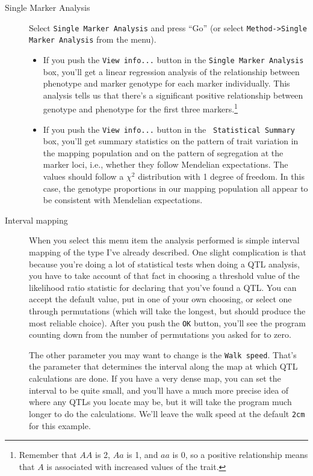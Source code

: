 \documentclass[12pt]{article}
\begin{document}
\begin{description}

\item[Single Marker Analysis] Select {\tt Single Marker Analysis} and
  press ``Go''  (or select {\tt Method->Single Marker Analysis} from the menu).

\begin{itemize}

\item If you push the {\tt View info...} button in the {\tt Single
    Marker Analysis} box, you'll get a linear regression analysis of
  the relationship between phenotype and marker genotype for each
  marker individually. This analysis tells us that there's a
  significant positive relationship between genotype and phenotype for
  the first three markers.\footnote{Remember that $AA$ is 2, $Aa$ is
    1, and $aa$ is 0, so a positive relationship means that $A$ is
    associated with increased values of the trait.}

\item If you push the {\tt View info...} button in the {\tt
  Statistical Summary} box, you'll get summary statistics on the
  pattern of trait variation in the mapping population and on the
  pattern of segregation at the marker loci, i.e., whether they follow
  Mendelian expectations. The values should follow a $\chi^2$
  distribution with 1 degree of freedom. In this case, the genotype
  proportions in our mapping population all appear to be consistent
  with Mendelian expectations.

\end{itemize}

\item[Interval mapping] When you select this menu item the analysis
  performed is simple interval mapping of the type I've already
  described. One slight complication is that because you're doing a
  lot of statistical tests when doing a QTL analysis, you have to take
  account of that fact in choosing a threshold value of the likelihood
  ratio statistic for declaring that you've found a QTL. You can
  accept the default value, put in one of your own choosing, or select
  one through permutations (which will take the longest, but should
  produce the most reliable choice). After you push the {\tt OK}
  button, you'll see the program counting down from the number of
  permutations you asked for to zero. 

  The other parameter you may want to change is the {\tt Walk
  speed}. That's the parameter that determines the interval along the
  map at which QTL calculations are done. If you have a very dense
  map, you can set the interval to be quite small, and you'll have a
  much more precise idea of where any QTLs you locate may be, but it
  will take the program much longer to do the calculations. We'll
  leave the walk speed at the default {\tt 2cm} for this example.


\end{description}
\end{document}
